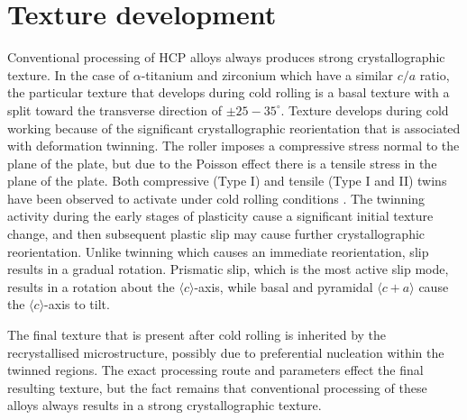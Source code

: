 \section{Texture development}
Conventional processing of HCP alloys always produces strong crystallographic texture.
In the case of $\alpha$-titanium and zirconium which have a similar $c/a$ ratio, the particular texture that develops during cold rolling is a basal texture with a split toward the transverse direction of $\pm 25-35^\circ$.
Texture develops during cold working because of the significant crystallographic reorientation that is associated with deformation twinning.
The roller imposes a compressive stress normal to the plane of the plate, but due to the Poisson effect there is a tensile stress in the plane of the plate.
Both compressive (Type I) and tensile (Type I and II) twins have been observed to activate under cold rolling conditions \cite{bozzoloMisorientationsInducedDeformation2010}.
The twinning activity during the early stages of plasticity cause a significant initial texture change, and then subsequent plastic slip may cause further crystallographic reorientation.
Unlike twinning which causes an immediate reorientation, slip results in a gradual rotation.
Prismatic slip, which is the most active slip mode, results in a rotation about the $\langle c \rangle$-axis, while basal and pyramidal $\langle c + a \rangle$ cause the $\langle c \rangle$-axis to tilt.

The final texture that is present after cold rolling is inherited by the recrystallised microstructure, possibly due to preferential nucleation within the twinned regions.
The exact processing route and parameters effect the final resulting texture, but the fact remains that conventional processing of these alloys always results in a strong crystallographic texture.


